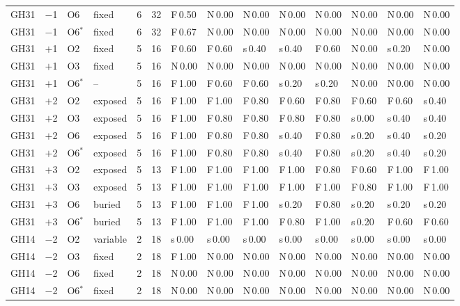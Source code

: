 \documentclass[preprint,12pt]{elsarticle}
\begin{document}
{\begin{longtable}{llllrrllllllll}
GH31 & $-$1 & O6 & fixed & 6 & 32 & F\,0.50 & N\,0.00 & N\,0.00 & N\,0.00 & N\,0.00 & N\,0.00 & N\,0.00 & N\,0.00\\
GH31 & $-$1 & O6$^\ast$ & fixed & 6 & 32 & F\,0.67 & N\,0.00 & N\,0.00 & N\,0.00 & N\,0.00 & N\,0.00 & N\,0.00 & N\,0.00\\
GH31 & $+$1 & O2 & fixed & 5 & 16 & F\,0.60 & F\,0.60 & s\,0.40 & s\,0.40 & F\,0.60 & N\,0.00 & s\,0.20 & N\,0.00\\
GH31 & $+$1 & O3 & fixed & 5 & 16 & N\,0.00 & N\,0.00 & N\,0.00 & N\,0.00 & N\,0.00 & N\,0.00 & N\,0.00 & N\,0.00\\
GH31 & $+$1 & O6$^\ast$ & -- & 5 & 16 & F\,1.00 & F\,0.60 & F\,0.60 & s\,0.20 & s\,0.20 & N\,0.00 & N\,0.00 & N\,0.00\\
GH31 & $+$2 & O2 & exposed & 5 & 16 & F\,1.00 & F\,1.00 & F\,0.80 & F\,0.60 & F\,0.80 & F\,0.60 & F\,0.60 & s\,0.40\\
GH31 & $+$2 & O3 & exposed & 5 & 16 & F\,1.00 & F\,0.80 & F\,0.80 & F\,0.80 & F\,0.80 & s\,0.00 & s\,0.40 & s\,0.40\\
GH31 & $+$2 & O6 & exposed & 5 & 16 & F\,1.00 & F\,0.80 & F\,0.80 & s\,0.40 & F\,0.80 & s\,0.20 & s\,0.40 & s\,0.20\\
GH31 & $+$2 & O6$^\ast$ & exposed & 5 & 16 & F\,1.00 & F\,0.80 & F\,0.80 & s\,0.40 & F\,0.80 & s\,0.20 & s\,0.40 & s\,0.20\\
GH31 & $+$3 & O2 & exposed & 5 & 13 & F\,1.00 & F\,1.00 & F\,1.00 & F\,1.00 & F\,0.80 & F\,0.60 & F\,1.00 & F\,1.00\\
GH31 & $+$3 & O3 & exposed & 5 & 13 & F\,1.00 & F\,1.00 & F\,1.00 & F\,1.00 & F\,1.00 & F\,0.80 & F\,1.00 & F\,1.00\\
GH31 & $+$3 & O6 & buried & 5 & 13 & F\,1.00 & F\,1.00 & F\,1.00 & s\,0.20 & F\,0.80 & s\,0.20 & s\,0.20 & s\,0.20\\
GH31 & $+$3 & O6$^\ast$ & buried & 5 & 13 & F\,1.00 & F\,1.00 & F\,1.00 & F\,0.80 & F\,1.00 & s\,0.20 & F\,0.60 & F\,0.60\\
\addlinespace
GH14 & $-$2 & O2 & variable & 2 & 18 & s\,0.00 & s\,0.00 & s\,0.00 & s\,0.00 & s\,0.00 & s\,0.00 & s\,0.00 & s\,0.00\\
GH14 & $-$2 & O3 & fixed & 2 & 18 & F\,1.00 & N\,0.00 & N\,0.00 & N\,0.00 & N\,0.00 & N\,0.00 & N\,0.00 & N\,0.00\\
GH14 & $-$2 & O6 & fixed & 2 & 18 & N\,0.00 & N\,0.00 & N\,0.00 & N\,0.00 & N\,0.00 & N\,0.00 & N\,0.00 & N\,0.00\\
GH14 & $-$2 & O6$^\ast$ & fixed & 2 & 18 & N\,0.00 & N\,0.00 & N\,0.00 & N\,0.00 & N\,0.00 & N\,0.00 & N\,0.00 & N\,0.00\\

\end{longtable}}
\end{document}

